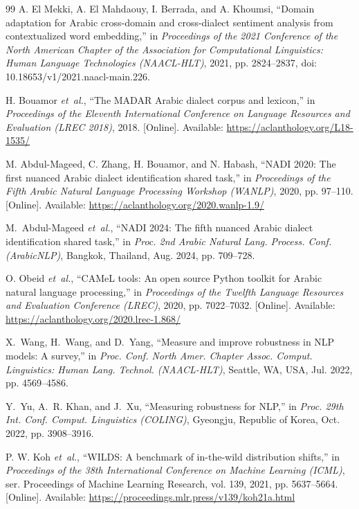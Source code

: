 \begin{thebibliography}{99}
A. El Mekki, A. El Mahdaouy, I. Berrada, and A. Khoumsi, ``Domain adaptation for {A}rabic cross-domain and cross-dialect sentiment analysis from contextualized word embedding,'' in \emph{Proceedings of the 2021 Conference of the North American Chapter of the Association for Computational Linguistics: Human Language Technologies (NAACL-HLT)}, 2021, pp. 2824--2837, doi: 10.18653/v1/2021.naacl-main.226.

H. Bouamor \emph{et~al.}, ``The {MADAR} {A}rabic dialect corpus and lexicon,'' in \emph{Proceedings of the Eleventh International Conference on Language Resources and Evaluation (LREC 2018)}, 2018. [Online]. Available: \url{https://aclanthology.org/L18-1535/}

M. Abdul-Mageed, C. Zhang, H. Bouamor, and N. Habash, ``{NADI} 2020: The first nuanced {A}rabic dialect identification shared task,'' in \emph{Proceedings of the Fifth Arabic Natural Language Processing Workshop (WANLP)}, 2020, pp. 97--110. [Online]. Available: \url{https://aclanthology.org/2020.wanlp-1.9/}

M.~Abdul-Mageed \emph{et~al.}, ``NADI 2024: The fifth nuanced Arabic dialect identification shared task,'' in \emph{Proc. 2nd Arabic Natural Lang. Process. Conf. (ArabicNLP)}, Bangkok, Thailand, Aug. 2024, pp. 709--728.

O. Obeid \emph{et~al.}, ``{CAMeL} tools: An open source {P}ython toolkit for {A}rabic natural language processing,'' in \emph{Proceedings of the Twelfth Language Resources and Evaluation Conference (LREC)}, 2020, pp. 7022--7032. [Online]. Available: \url{https://aclanthology.org/2020.lrec-1.868/}

X.~Wang, H.~Wang, and D.~Yang, ``Measure and improve robustness in NLP models: A survey,'' in \emph{Proc. Conf. North Amer. Chapter Assoc. Comput. Linguistics: Human Lang. Technol. (NAACL-HLT)}, Seattle, WA, USA, Jul. 2022, pp. 4569--4586.

Y.~Yu, A.~R. Khan, and J.~Xu, ``Measuring robustness for NLP,'' in \emph{Proc. 29th Int. Conf. Comput. Linguistics (COLING)}, Gyeongju, Republic of Korea, Oct. 2022, pp. 3908--3916.

P. W. Koh \emph{et~al.}, ``{WILDS}: A benchmark of in-the-wild distribution shifts,'' in \emph{Proceedings of the 38th International Conference on Machine Learning (ICML)}, ser. Proceedings of Machine Learning Research, vol. 139, 2021, pp. 5637--5664. [Online]. Available: \url{https://proceedings.mlr.press/v139/koh21a.html}


\end{thebibliography}
